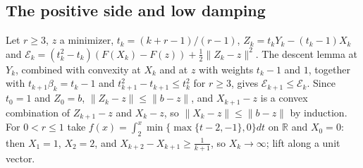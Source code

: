\documentclass[11pt]{article}
\numberwithin{equation}{section}
\theoremstyle{definition}
\theoremstyle{remark}
\newcommand{\R}{\mathbb R}
\newcommand{\norm}[1]{\lVert #1\rVert}
\begin{document}
\subsection{The positive side and low damping}
Let $r\ge3$, $z$ a minimizer, $t_k=(k+r-1)/(r-1)$, $Z_k=t_kY_k-(t_k-1)X_k$ and $\mathcal E_k=(t_k^2-t_k)(F(X_k)-F(z))+\frac12\norm{Z_k-z}^2$. The descent lemma at $Y_k$, combined with convexity at $X_k$ and at $z$ with weights $t_k-1$ and $1$, together with $t_{k+1}\beta_k=t_k-1$ and $t_{k+1}^2-t_{k+1}\le t_k^2$ for $r\ge3$, gives $\mathcal E_{k+1}\le\mathcal E_k$. Since $t_0=1$ and $Z_0=b$, $\norm{Z_k-z}\le\norm{b-z}$, and $X_{k+1}-z$ is a convex combination of $Z_{k+1}-z$ and $X_k-z$, so $\norm{X_k-z}\le\norm{b-z}$ by induction. For $0<r\le1$ take $f(x)=\int_2^x\min\{\max\{t-2,-1\},0\}dt$ on $\R$ and $X_0=0$: then $X_1=1$, $X_2=2$, and $X_{k+2}-X_{k+1}\ge\frac1{k+1}$, so $X_k\to\infty$; lift along a unit vector.
\end{document}
